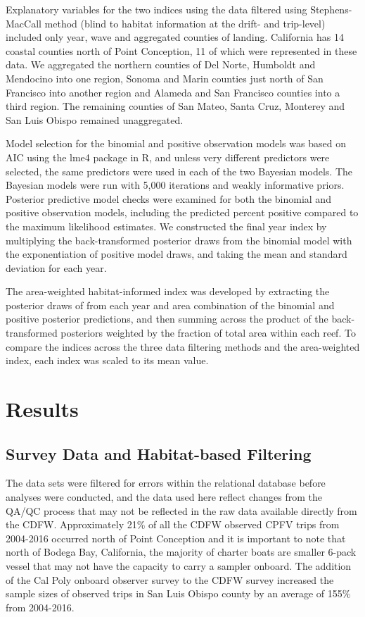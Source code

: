 \documentclass[
  12pt,
  authoryear,
  preprint,
  3p]{elsarticle}
\begin{document}
Explanatory variables for the two indices using the data filtered using
Stephens-MacCall method (blind to habitat information at the drift- and
trip-level) included only year, wave and aggregated counties of landing.
California has 14 coastal counties north of Point Conception, 11 of
which were represented in these data. We aggregated the northern
counties of Del Norte, Humboldt and Mendocino into one region, Sonoma
and Marin counties just north of San Francisco into another region and
Alameda and San Francisco counties into a third region. The remaining
counties of San Mateo, Santa Cruz, Monterey and San Luis Obispo remained
unaggregated.

Model selection for the binomial and positive observation models was
based on AIC using the lme4 package in R, and unless very different
predictors were selected, the same predictors were used in each of the
two Bayesian models. The Bayesian models were run with 5,000 iterations
and weakly informative priors. Posterior predictive model checks were
examined for both the binomial and positive observation models,
including the predicted percent positive compared to the maximum
likelihood estimates. We constructed the final year index by multiplying
the back-transformed posterior draws from the binomial model with the
exponentiation of positive model draws, and taking the mean and standard
deviation for each year.

The area-weighted habitat-informed index was developed by extracting the
posterior draws of from each year and area combination of the binomial
and positive posterior predictions, and then summing across the product
of the back-transformed posteriors weighted by the fraction of total
area within each reef. To compare the indices across the three data
filtering methods and the area-weighted index, each index was scaled to
its mean value.

\hypertarget{results}{%
\section{Results}\label{results}}

\hypertarget{survey-data-and-habitat-based-filtering-1}{%
\subsection{Survey Data and Habitat-based
Filtering}\label{survey-data-and-habitat-based-filtering-1}}

The data sets were filtered for errors within the relational database
before analyses were conducted, and the data used here reflect changes
from the QA/QC process that may not be reflected in the raw data
available directly from the CDFW. Approximately 21\% of all the CDFW
observed CPFV trips from 2004-2016 occurred north of Point Conception
and it is important to note that north of Bodega Bay, California, the
majority of charter boats are smaller 6-pack vessel that may not have
the capacity to carry a sampler onboard. The addition of the Cal Poly
onboard observer survey to the CDFW survey increased the sample sizes of
observed trips in San Luis Obispo county by an average of 155\% from
2004-2016.
\end{document}

